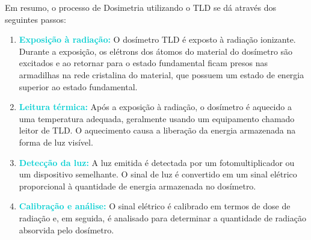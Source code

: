 \documentclass[11pt,a4paper]{article}
\begin{document}
		
		
		
	
	Em resumo, o processo de Dosimetria utilizando o TLD se dá através dos seguintes passos:

		\begin{enumerate}
			\item \textcolor{DarkTurquoise}{\textbf{Exposição à radiação:}} O dosímetro TLD é exposto à radiação ionizante. Durante a exposição, os elétrons dos átomos do material do dosímetro são excitados e ao retornar para o estado fundamental ficam presos nas armadilhas na rede cristalina do material, que possuem um estado de energia superior ao estado fundamental.
			\item \textcolor{DarkTurquoise}{\textbf{Leitura térmica:}} Após a exposição à radiação, o dosímetro é aquecido a uma temperatura adequada, geralmente usando um equipamento chamado leitor de TLD. O aquecimento causa a liberação da energia armazenada na forma de luz visível.
			\item \textcolor{DarkTurquoise}{\textbf{Detecção da luz:}} A luz emitida é detectada por um fotomultiplicador ou um dispositivo semelhante. O sinal de luz é convertido em um sinal elétrico proporcional à quantidade de energia armazenada no dosímetro.
			\item \textcolor{DarkTurquoise}{\textbf{Calibração e análise:}} O sinal elétrico é calibrado em termos de dose de radiação e, em seguida, é analisado para determinar a quantidade de radiação absorvida pelo dosímetro.
		\end{enumerate}
		
\end{document}

